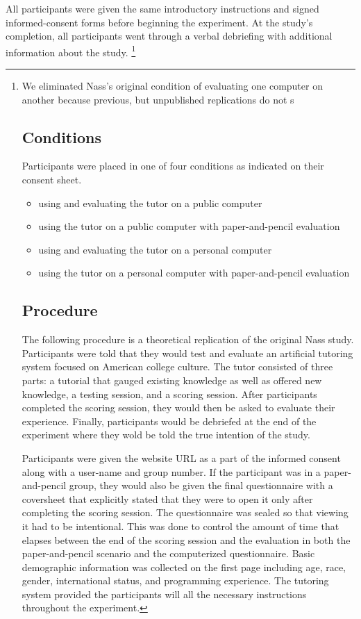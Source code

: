\documentclass{sig-alternate-05-2015}
\begin{document}
 All participants were given the same introductory instructions and signed informed-consent forms before beginning the experiment.  At the study's completion, all participants went through a verbal debriefing with additional information about the study. \footnote{We eliminated Nass's original condition of evaluating one computer on another because previous, but unpublished replications do not s

\subsection{Conditions}
Participants were placed in one of four conditions as indicated on their consent sheet.    
\begin{itemize}
    \item using and evaluating the tutor on a public computer 
    \item using the tutor on a public computer with paper-and-pencil evaluation
    \item using and evaluating the tutor on a personal computer
    \item using the tutor on a personal computer with paper-and-pencil evaluation
\end{itemize}



\subsection{Procedure}

The following procedure is a theoretical replication of the original Nass study.   Participants were told that they would test and evaluate an artificial tutoring system focused on American college culture.  The tutor consisted of three parts: a tutorial that gauged existing knowledge as well as offered new knowledge, a testing session, and a scoring session.  After participants completed the scoring session, they would then be asked to evaluate their experience.  Finally, participants would be debriefed at the end of the experiment where they wold be told the true intention of the study.  

Participants were given the website URL as a part of the informed consent along with a user-name and group number.  If the participant was in a paper-and-pencil group, they would also be given the final questionnaire with a coversheet that explicitly stated that they were to open it only after completing the scoring session.  The questionnaire was sealed so that viewing it had to be intentional.  This was done to control the amount of time that elapses between the end of the scoring session and the evaluation in both the paper-and-pencil scenario and the computerized questionnaire.  Basic demographic information was collected on the first page including age, race, gender, international status, and programming experience. The tutoring system provided the participants will all the necessary instructions throughout the experiment.  

}
\end{document}
